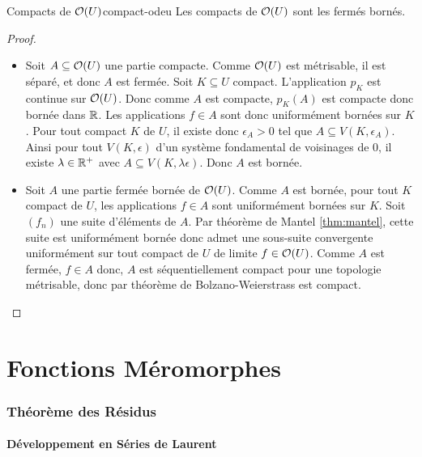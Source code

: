 \documentclass{cours}
\begin{document}
\begin{théorème}{Compacts de $\mathcal{O}(U)$}{compact-odeu}
    Les compacts de $\mathcal{O}(U)$ sont les fermés bornés.
\end{théorème}
\begin{proof}
    \begin{itemize}
        \item Soit $A \subseteq \mathcal{O}(U)$ une partie compacte. 
        Comme $\mathcal{O}(U)$ est métrisable, il est séparé, et donc $A$ est fermée. 
        Soit $K \subseteq U$ compact. 
        L'application $p_{K}$ est continue sur $\mathcal{O}(U)$. Donc comme $A$ est compacte, $p_{K}(A)$ est compacte donc bornée dans $\mathbb{R}$. 
        Les applications $f\in A$ sont donc uniformément bornées sur $K$. 
        Pour tout compact $K$ de $U$, il existe donc $\epsilon_{A} > 0$ tel que $A \subseteq V(K, \epsilon_{A})$. 
        Ainsi pour tout $V(K, \epsilon)$ d'un système fondamental de voisinages de $0$, il existe $\lambda \in \mathbb{R}^{+}$ avec $A \subseteq V(K, \lambda \epsilon)$.
        Donc $A$ est bornée.
        \item Soit $A$ une partie fermée bornée de $\mathcal{O}(U)$. 
        Comme $A$ est bornée, pour tout $K$ compact de $U$, les applications $f \in A$ sont uniformément bornées sur $K$. Soit $(f_{n})$ une suite d'éléments de $A$. 
        Par théorème de Mantel \ref{thm:mantel}, cette suite est uniformément bornée donc admet une sous-suite convergente uniformément sur tout compact de $U$ de limite $f \in \mathcal{O}(U)$.
        Comme $A$ est fermée, $f \in A$ donc, $A$ est séquentiellement compact pour une topologie métrisable, donc par théorème de Bolzano-Weierstrass est compact. 
    \end{itemize}
\end{proof}

\part{Fonctions Méromorphes}
\section{Théorème des Résidus}
\subsection{Développement en Séries de Laurent}
\end{document}
